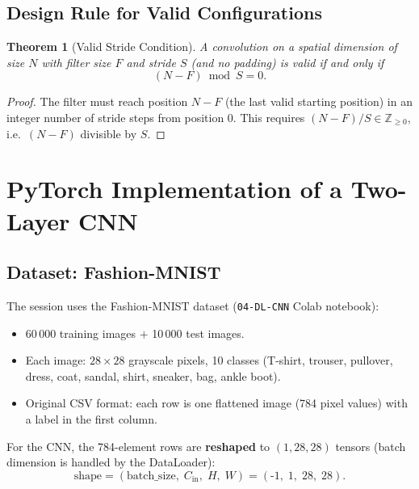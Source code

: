 \documentclass[12pt,a4paper]{article}
\newtheorem{theorem}{Theorem}[section]
\begin{document}
\subsection{Design Rule for Valid Configurations}
\label{subsec:valid_rule}

\begin{theorem}[Valid Stride Condition]
\label{thm:valid_stride}
A convolution on a spatial dimension of size $N$ with filter size $F$ and
stride $S$ (and no padding) is valid if and only if
\begin{equation}
  (N - F) \bmod S = 0.
  \label{eq:valid_cond}
\end{equation}
\end{theorem}

\begin{proof}
The filter must reach position $N-F$ (the last valid starting position) in an
integer number of stride steps from position $0$.  This requires
$(N-F) / S \in \mathbb{Z}_{\geq 0}$, i.e.\ $(N-F)$ divisible by $S$.
\end{proof}

\section{PyTorch Implementation of a Two-Layer CNN}
\label{sec:pytorch}

\subsection{Dataset: Fashion-MNIST}
\label{subsec:dataset}

The session uses the Fashion-MNIST dataset (\texttt{04-DL-CNN} Colab notebook):
\begin{itemize}[leftmargin=2em]
  \item 60\,000 training images $+$ 10\,000 test images.
  \item Each image: $28\times28$ grayscale pixels, 10 classes
        (T-shirt, trouser, pullover, dress, coat, sandal, shirt, sneaker,
        bag, ankle boot).
  \item Original CSV format: each row is one flattened image (784 pixel
        values) with a label in the first column.
\end{itemize}

For the CNN, the 784-element rows are \textbf{reshaped} to
$(1, 28, 28)$ tensors (batch dimension is handled by the DataLoader):
\begin{equation}
  \text{shape} = (\text{batch\_size},\; C_{\text{in}},\; H,\; W)
               = (\text{-}1,\; 1,\; 28,\; 28).
  \label{eq:data_shape}
\end{equation}
\end{document}
